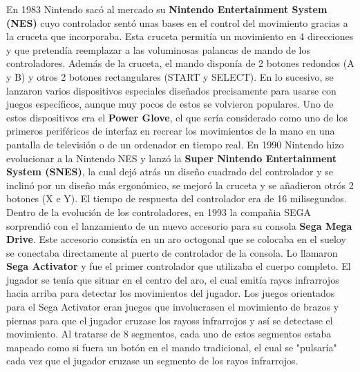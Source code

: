 En 1983 Nintendo sac\'o al mercado su \textbf{Nintendo Entertainment System (NES)} cuyo controlador sent\'o unas bases en el control del movimiento gracias a la cruceta que incorporaba. Esta cruceta permit\'ia un movimiento en 4 direcciones y que pretend\'ia reemplazar a las voluminosas palancas de mando de los controladores. Adem\'as de la cruceta, el mando dispon\'ia de 2 botones redondos (A y B) y otros 2 botones rectangulares (START y SELECT). En lo sucesivo, se lanzaron varios dispositivos especiales dise\~nados precisamente para usarse con juegos espec\'ificos, aunque muy pocos de estos se volvieron populares. Uno de estos dispositivos era el \textbf{Power Glove}, el que ser\'ia considerado como uno de los primeros perif\'ericos de interfaz en recrear los movimientos de la mano en una pantalla de televisi\'on o de un ordenador en tiempo real. En 1990 Nintendo hizo evolucionar a la Nintendo NES y lanz\'o la \textbf{Super Nintendo Entertainment System (SNES)}, la cual dej\'o atr\'as un dise\~no cuadrado del controlador y se inclin\'o por un dise\~no m\'as ergon\'omico, se mejor\'o la cruceta y se a\~nadieron otr\'os 2 botones (X e Y). El tiempo de respuesta del controlador era de 16 milisegundos. Dentro de la evoluci\'on de los controladores, en 1993 la compa\~nia SEGA sorprendi\'o con el lanzamiento de un nuevo accesorio para su consola \textbf{Sega Mega Drive}. Este accesorio consist\'ia en un aro octogonal que se colocaba en el sueloy se conectaba directamente al puerto de controlador de la consola. Lo llamaron \textbf{Sega Activator} y fue el primer controlador que utilizaba el cuerpo completo. El jugador se ten\'ia que situar en el centro del aro, el cual emit\'ia rayos infrarrojos hacia arriba para detectar los movimientos del jugador. Los juegos orientados para el Sega Activator eran juegos que involucrasen el movimiento de brazos y piernas para que el jugador cruzase los rayoss infrarrojos y as\'i se detectase el movimiento. Al tratarse de 8 segmentos, cada uno de estos segmentos estaba mapeado como si fuera un bot\'on en el mando tradicional, el cual se "pulsar\'ia" cada vez que el jugador cruzase un segmento de los rayos infrarrojos. \\

